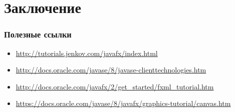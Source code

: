 \documentclass[xetex,mathserif,serif]{beamer}
\begin{document}
	\section{Заключение}

	\begin{frame}
		\frametitle{Полезные ссылки}
		\begin{itemize}
			\item \url{http://tutorials.jenkov.com/javafx/index.html}
			\item \url{http://docs.oracle.com/javase/8/javase-clienttechnologies.htm}
			\item \url{http://docs.oracle.com/javafx/2/get_started/fxml_tutorial.htm}
			\item \url{https://docs.oracle.com/javase/8/javafx/graphics-tutorial/canvas.htm}
		\end{itemize}
	\end{frame}
\end{document}

